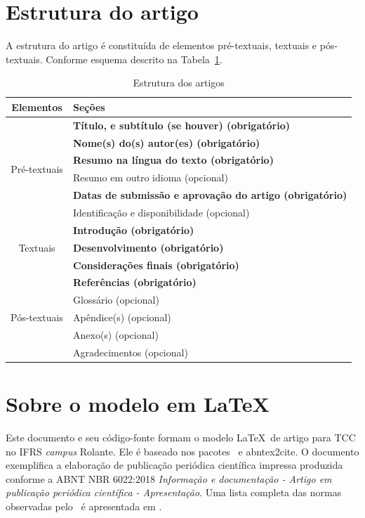 \documentclass[
	article,			%
	12pt,				%
	oneside,			%
	a4paper,			%
	english,			%
	brazil,				%
	sumario=tradicional
]{abntex2}
\begin{document}
\section{Estrutura do artigo}

A estrutura do artigo é constituída de elementos pré-textuais, textuais e pós-textuais. Conforme esquema descrito na Tabela~\ref{tbl1}.

\begin{table}[h]
	\centering
	\label{tbl1}
	\caption{Estrutura dos artigos}
	\begin{tabularx}{\textwidth}{cX} \toprule
		Elementos & Seções \\ \midrule
		\multirow{6}{*}{Pré-textuais} & \textbf{Título, e subtítulo (se houver) (obrigatório)} \\
		& \textbf{Nome(s) do(s) autor(es) (obrigatório)} \\ 
		& \textbf{Resumo na língua do texto (obrigatório)} \\
		& Resumo em outro idioma (opcional) \\
		& \textbf{Datas de submissão e aprovação do artigo (obrigatório)} \\
		& Identificação e disponibilidade (opcional) \\ \midrule
		\multirow{3}{*}{Textuais} & \textbf{Introdução (obrigatório)} \\ 
		& \textbf{Desenvolvimento (obrigatório)} \\ 
		& \textbf{Considerações finais (obrigatório)} \\ \midrule
		\multirow{5}{*}{Pós-textuais} & \textbf{Referências (obrigatório)} \\
		& Glossário (opcional) \\
		& Apêndice(s) (opcional) \\
		& Anexo(s) (opcional) \\
		& Agradecimentos (opcional)  \\ \bottomrule
	\end{tabularx} 
\end{table}

\section{Sobre o modelo em \LaTeX}

Este documento e seu código-fonte formam o modelo \LaTeX\ de artigo para TCC no IFRS \textit{campus} Rolante. Ele é baseado nos pacotes \abnTeX\ e \textsf{abntex2cite}. O documento exemplifica a elaboração de publicação periódica científica impressa produzida conforme a ABNT NBR 6022:2018 \emph{Informação e documentação - Artigo em publicação periódica científica - Apresentação}. Uma lista completa das normas observadas pelo \abnTeX\  é apresentada em .
\end{document}
